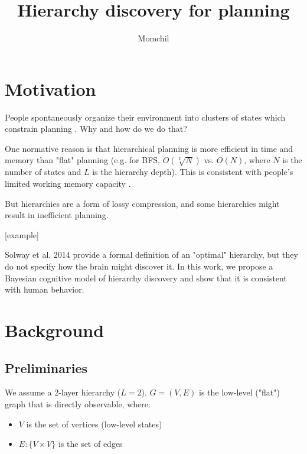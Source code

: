 \documentclass[11pt]{article}
\title{Hierarchy discovery for planning}
\author{Momchil}
\begin{document}
\maketitle




\section{Motivation}

People spontaneously organize their environment into clusters of states which constrain planning \cite{Solway2014, Schapiro2013, balaguer2016neural}. Why and how do we do that?

One normative reason is that hierarchical planning is more efficient in time and memory than "flat" planning \cite{fernandez2013multi} (e.g. for BFS, $O(\sqrt[L]{N})$ vs. $O(N)$, where $N$ is the number of states and $L$ is the hierarchy depth). This is consistent with people's limited working memory capacity \cite{miller1956magic}.

But hierarchies are a form of lossy compression, and some hierarchies might result in inefficient planning.

[example]

Solway et al. 2014 \cite{Solway2014} provide a formal definition of an "optimal" hierarchy, but they do not specify how the brain might discover it. In this work, we propose a Bayesian cognitive model of hierarchy discovery and show that it is consistent with human behavior.

\section{Background}

\subsection{Preliminaries}

We assume a 2-layer hierarchy ($L = 2$). $G = (V,E)$ is the low-level ("flat") graph that is directly observable, where:

\begin{itemize}
    \item $V$ is the set of vertices (low-level states)
    \item $E: \{V \times V\}$ is the set of edges
\end{itemize}
\end{document}
